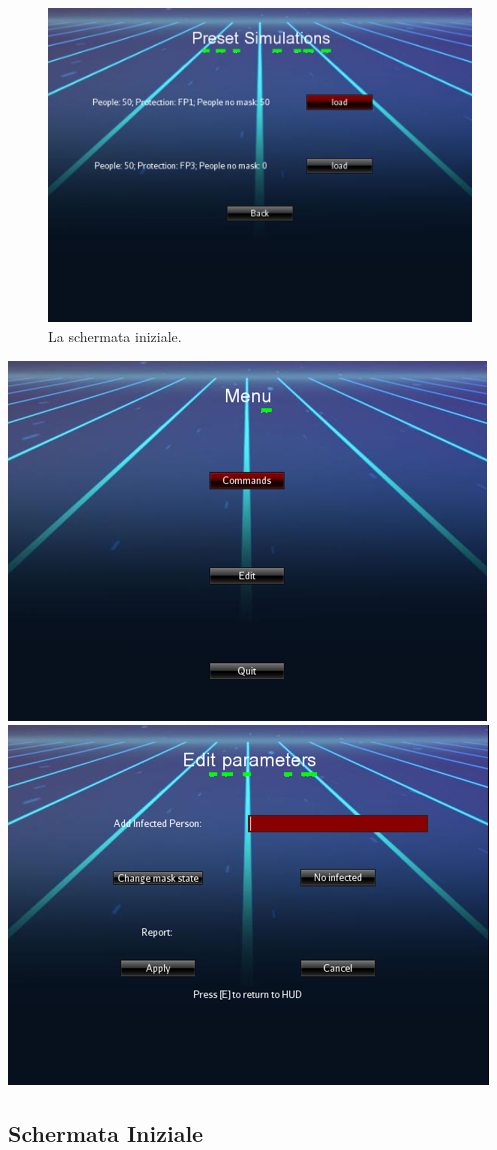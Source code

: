 \begin{figure}[h]
\centering{}
\includegraphics{2.png} 
\caption{La schermata iniziale.}
\label{img:startscreen}
\end{figure}

\includegraphics[scale=1]{4.png}
\includegraphics[scale=1]{5.png}

\subsection{Schermata Iniziale}





